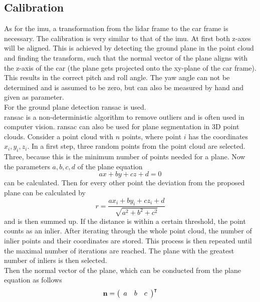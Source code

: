 \subsection{Calibration}
\label{ssec:calibration_lidar}
As for the \gls{imu}, a transformation from the \gls{lidar} frame to the car frame is necessary.
The calibration is very similar to that of the \gls{imu}.
At first both z-axes will be aligned.
This is achieved by detecting the ground plane in the point cloud and finding the transform, such that the normal vector of the plane aligns with the z-axis of the car (the plane gets projected onto the xy-plane of the car frame).
This results in the correct pitch and roll angle.
The yaw angle can not be determined and is assumed to be zero, but can also be measured by hand and given as parameter.\\
For the ground plane detection \gls{ransac} \cite{Fischler1981} is used.\\
\gls{ransac} is a non-deterministic algorithm to remove outliers and is often used in computer vision.
\gls{ransac} can also be used for plane segmentation in 3D point clouds.
Consider a point cloud with $n$ points, where point $i$ has the coordinates $x_i, y_i, z_i$.
In a first step, three random points from the point cloud are selected.
Three, because this is the minimum number of points needed for a plane.
Now the parameters $a, b, c, d$ of the plane equation
\begin{equation}
	ax + by + cz + d = 0
\end{equation}
can be calculated.
Then for every other point the deviation from the proposed plane can be calculated by
\begin{equation}
	r = \frac{ax_i + by_i + cz_i + d}{\sqrt{a^2 + b^2 + c^2}}
\end{equation}
and is then summed up.
If the distance is within a certain threshold, the point counts as an inlier.
After iterating through the whole point cloud, the number of inlier points and their coordinates are stored.
This process is then repeated until the maximal number of iterations are reached.
The plane with the greatest number of inliers is then selected.\\
Then the normal vector of the plane, which can be conducted from the plane equation as follows
\begin{equation}
	\vb{n} = \left(\begin{array}{lll} a & b & c \end{array}\right)^{\intercal}
\end{equation}
